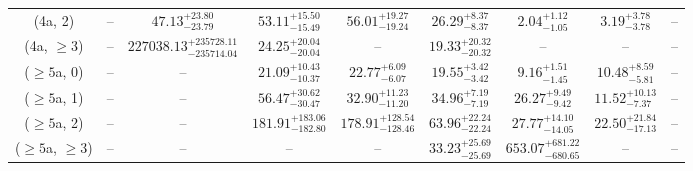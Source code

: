 \begin{table}[h!]
{\begin{tabular}{ccccccccc}
	(4a, 2) & -- & $47.13^{+ 23.80 }_{- 23.79 }$ & $53.11^{+ 15.50 }_{- 15.49 }$ & $56.01^{+ 19.27 }_{- 19.24 }$ & $26.29^{+ 8.37 }_{- 8.37 }$ & $2.04^{+ 1.12 }_{- 1.05 }$ & $3.19^{+ 3.78 }_{- 3.78 }$ & -- \\[0.5ex] 
	(4a, $\ge3$) & -- & $227038.13^{+ 235728.11 }_{- 235714.04 }$ & $24.25^{+ 20.04 }_{- 20.04 }$ & -- & $19.33^{+ 20.32 }_{- 20.32 }$ & -- & -- & -- \\[0.5ex] 
	($\ge5$a, 0) & -- & -- & $21.09^{+ 10.43 }_{- 10.37 }$ & $22.77^{+ 6.09 }_{- 6.07 }$ & $19.55^{+ 3.42 }_{- 3.42 }$ & $9.16^{+ 1.51 }_{- 1.45 }$ & $10.48^{+ 8.59 }_{- 5.81 }$ & -- \\[0.5ex] 
	($\ge5$a, 1) & -- & -- & $56.47^{+ 30.62 }_{- 30.47 }$ & $32.90^{+ 11.23 }_{- 11.20 }$ & $34.96^{+ 7.19 }_{- 7.19 }$ & $26.27^{+ 9.49 }_{- 9.42 }$ & $11.52^{+ 10.13 }_{- 7.37 }$ & -- \\[0.5ex] 
	($\ge5$a, 2) & -- & -- & $181.91^{+ 183.06 }_{- 182.80 }$ & $178.91^{+ 128.54 }_{- 128.46 }$ & $63.96^{+ 22.24 }_{- 22.24 }$ & $27.77^{+ 14.10 }_{- 14.05 }$ & $22.50^{+ 21.84 }_{- 17.13 }$ & -- \\[0.5ex] 
	($\ge5$a, $\ge3$) & -- & -- & -- & -- & $33.23^{+ 25.69 }_{- 25.69 }$ & $653.07^{+ 681.22 }_{- 680.65 }$ & -- & -- \\[0.5ex] 
	\hline
	\hline
\end{tabular}}
\end{table}
